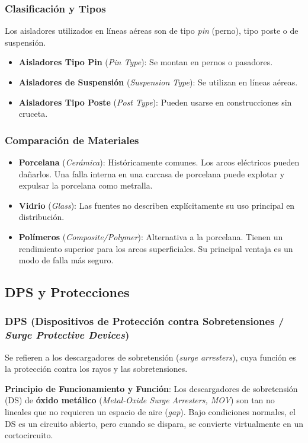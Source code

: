 \subsubsection*{Clasificación y Tipos}
Los aisladores utilizados en líneas aéreas son de tipo \textit{pin} (perno), tipo poste o de suspensión.
\begin{itemize}
    \item \textbf{Aisladores Tipo Pin} (\textit{Pin Type}): Se montan en pernos o pasadores.
    \item \textbf{Aisladores de Suspensión} (\textit{Suspension Type}): Se utilizan en líneas aéreas.
    \item \textbf{Aisladores Tipo Poste} (\textit{Post Type}): Pueden usarse en construcciones sin cruceta.
\end{itemize}

\subsubsection*{Comparación de Materiales}
\begin{itemize}
    \item \textbf{Porcelana} (\textit{Cerámica}): Históricamente comunes. Los arcos eléctricos pueden dañarlos. Una falla interna en una carcasa de porcelana puede explotar y expulsar la porcelana como metralla.
    \item \textbf{Vidrio} (\textit{Glass}): Las fuentes no describen explícitamente su uso principal en distribución.
    \item \textbf{Polímeros} (\textit{Composite/Polymer}): Alternativa a la porcelana. Tienen un rendimiento superior para los arcos superficiales. Su principal ventaja es un modo de falla más seguro.
\end{itemize}

\subsection*{DPS y Protecciones}

\subsubsection*{DPS (Dispositivos de Protección contra Sobretensiones / \textit{Surge Protective Devices})}
Se refieren a los descargadores de sobretensión (\textit{surge arresters}), cuya función es la protección contra los rayos y las sobretensiones.

\textbf{Principio de Funcionamiento y Función}: Los descargadores de sobretensión (DS) de \textbf{óxido metálico} (\textit{Metal-Oxide Surge Arresters, MOV}) son tan no lineales que no requieren un espacio de aire (\textit{gap}). Bajo condiciones normales, el DS es un circuito abierto, pero cuando se dispara, se convierte virtualmente en un cortocircuito.


